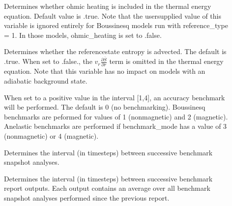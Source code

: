 \documentclass[letterpaper,11pt,english]{sphinxmanual}
\begin{document}
\begin{description}
\item[{}] \leavevmode
\sphinxAtStartPar
Determines whether ohmic heating is included in the thermal energy equation.  Default value is .true.  Note that the user\sphinxhyphen{}supplied value of this variable is ignored entirely for Boussinesq models run with reference\_type = 1.  In those models, ohmic\_heating is set to .false.

\item[{}] \leavevmode
\sphinxAtStartPar
Determines whether the reference\sphinxhyphen{}state entropy is advected.  The default is .true.  When set to .false., the \(v_r\frac{\partial\overline{S}}{\partial r}\) term is omitted in the thermal energy equation.  Note that this variable has no impact on models with an adiabatic background state.

\item[{}] \leavevmode
\sphinxAtStartPar
When set to a positive value in the interval {[}1,4{]}, an accuracy benchmark will be performed.  The default is 0 (no benchmarking).  Boussinesq benchmarks are peformed for values of 1 (nonmagnetic) and 2 (magnetic).  Anelastic benchmarks are performed if benchmark\_mode has a value of 3 (nonmagnetic) or 4 (magnetic).

\item[{}] \leavevmode
\sphinxAtStartPar
Determines the interval (in timesteps) between successive benchmark snapshot analyses.

\item[{}] \leavevmode
\sphinxAtStartPar
Determines the interval (in timesteps) between successive benchmark report outputs.  Each output contains an average over all benchmark snapshot analyses performed since the previous report.

\end{description}
\end{document}
